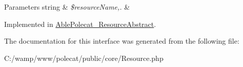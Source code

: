 \begin{DoxyParams}[1]{Parameters}
string & {\em \$resource\+Name,.} & \\
\hline
\end{DoxyParams}


Implemented in \hyperlink{class_able_polecat___resource_abstract_a396944828c457deecbba6acb9bee6abf}{Able\+Polecat\+\_\+\+Resource\+Abstract}.



The documentation for this interface was generated from the following file\+:\begin{DoxyCompactItemize}
\item 
C\+:/wamp/www/polecat/public/core/Resource.\+php\end{DoxyCompactItemize}
